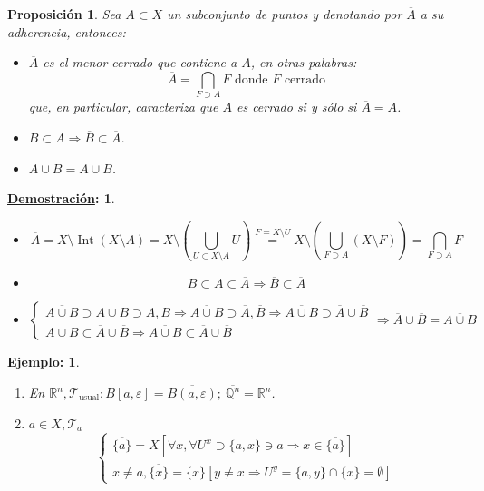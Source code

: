 \documentclass[10pt,a4paper,openright]{book}
\theoremstyle{break}
\newtheorem*{prop}{Proposición}
\newtheorem*{demo}{\underline{Demostración}:}
\newtheorem*{ej}{\underline{Ejemplo}:}
\DeclareMathOperator{\inter}{Int}
\begin{document}
\begin{prop}
Sea $A\subset X$ un subconjunto de puntos y denotando por $\overline{A}$ a su adherencia, entonces:
\begin{itemize}
\item $\overline{A}$ es el menor cerrado que contiene a $A$, en otras palabras:
$$
\overline{A} = \bigcap_{F \supset A} F \mbox{ donde }F \mbox{ cerrado}
$$
que, en particular, caracteriza que $A$ es cerrado si y sólo si $\overline{A} = A$.

\item $B \subset A \Rightarrow \overline{B} \subset \overline{A}$.
\item $\overline{A \cup B} = \overline{A} \cup \overline{B}$.
\end{itemize}
\end{prop}
\begin{demo}
\begin{itemize}
\item 
$$
\overline{A} = X \setminus \inter\left( X \setminus A \right) = X \setminus \left(\bigcup_{U \subset X \setminus A} U \right) \stackrel{F = X \setminus U}{=} X \setminus \left(\bigcup_{F \supset A} \left( X \setminus F \right) \right) = \bigcap_{F \supset A} F
$$
\item
$$
B\subset A \subset \overline{A} \Rightarrow \overline{B} \subset \overline{A}
$$
\item
$$
\begin{cases}
	\overline{A\cup B} \supset A \cup B \supset
		A,B \Rightarrow \overline{A\cup B} \supset
		\overline{A}, \overline{B} \Rightarrow \overline{A\cup B} \supset \overline{A} \cup \overline{B} \\
	A \cup B \subset \overline{A} \cup \overline{B} \Rightarrow \overline{A\cup B} \subset \overline{A} \cup \overline{B}
\end{cases} \Rightarrow \overline{A}\cup \overline{B} = \overline{A\cup B}
$$
\end{itemize}
\end{demo}

\begin{ej}
\begin{enumerate}
    \item En $\mathbb{R}^n, \mathcal{T}_{\text{usual}}: B\left[ a, \varepsilon \right] = \overline{B \left( a, \varepsilon \right)};\ \overline{\mathbb{Q}^n} = \mathbb{R}^n$.
    \item $a \in X, \mathcal{T}_a$
    \[
        \begin{cases}
        \overline{\{a\}} = X \left[ \forall x, \forall U^x \supset \{a, x\} \ni a \Rightarrow x \in \overline{\{a\}} \right]\\
        x \neq a, \overline{\{x\}} = \{x\} \left[ y\neq x \Rightarrow U^y = \{a, y\} \cap \{x\} = \emptyset \right] 
        \end{cases} 
    \]
\end{enumerate}
\end{ej}
\end{document}

